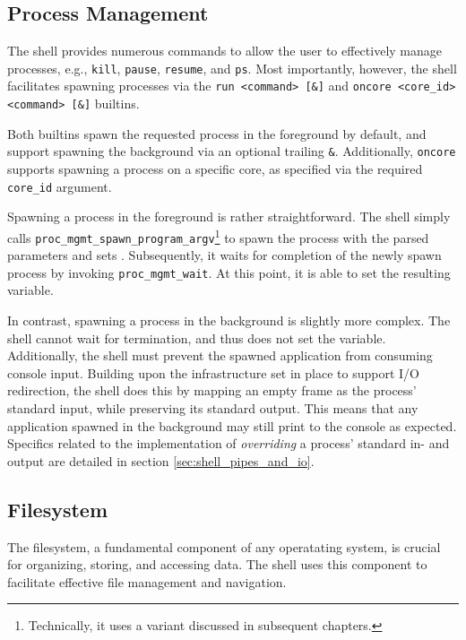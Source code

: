 \subsection{Process Management}

The shell provides numerous commands to allow the user to effectively manage processes, e.g., \texttt{kill}, \texttt{pause}, \texttt{resume}, and \texttt{ps}. Most importantly, however, the shell facilitates spawning processes via the \texttt{run <command> [\&]} and \texttt{oncore <core\_id> <command> [\&]} builtins. 

Both builtins spawn the requested process in the foreground by default, and support spawning the background via an optional trailing \texttt{\&}. Additionally, \texttt{oncore} supports spawning a process on a specific core, as specified via the required \texttt{core\_id} argument.


Spawning a process in the foreground is rather straightforward. The shell simply calls \texttt{proc\_mgmt\_spawn\_program\_argv}\footnote{Technically, it uses a variant discussed in subsequent chapters.} to spawn the process with the parsed parameters and sets \ShellVar{\$!}. Subsequently, it waits for completion of the newly spawn process by invoking \texttt{proc\_mgmt\_wait}. At this point, it is able to set the resulting  variable.

In contrast, spawning a process in the background is slightly more complex. The shell cannot wait for termination, and thus does not set the   variable. Additionally, the shell must prevent the spawned application from consuming console input. Building upon the infrastructure set in place to support I/O redirection, the shell does this by mapping an empty frame as the process' standard input, while preserving its standard output. This means that any application spawned in the background may still print to the console as expected. Specifics related to the implementation of \emph{overriding} a process' standard in- and output are detailed in section \ref{sec:shell_pipes_and_io}.

\subsection{Filesystem}


The filesystem, a fundamental component of any operatating system, is crucial for organizing, storing, and accessing data. The shell uses this component to facilitate effective file management and navigation.

